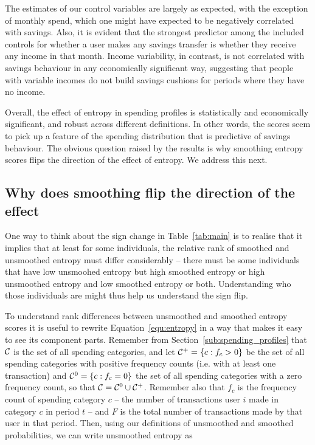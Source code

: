 The estimates of our control variables are largely as expected, with the
exception of monthly spend, which one might have expected to be negatively
correlated with savings. Also, it is evident that the strongest predictor among
the included controls for whether a user makes any savings transfer is whether
they receive any income in that month. Income variability, in contrast, is not
correlated with savings behaviour in any economically significant way,
suggesting that people with variable incomes do not build savings cushions for
periods where they have no income.

Overall, the effect of entropy in spending profiles is statistically and
economically significant, and robust across different definitions. In other
words, the scores seem to pick up a feature of the spending distribution that
is predictive of savings behaviour. The obvious question raised by the results
is why smoothing entropy scores flips the direction of the effect of entropy.
We address this next.


\subsection{Why does smoothing flip the direction of the effect}%
\label{sub:why_does_smoothing_flip_the_direction_of_the_effect}

One way to think about the sign change in Table~\ref{tab:main}
is to realise that it implies that at least for some individuals, the relative
rank of smoothed and unsmoothed entropy must differ considerably -- there must
be some individuals that have low unsmoohed entropy but high smoothed entropy
or high unsmoothed entropy and low smoothed entropy or both. Understanding who
those individuals are might thus help us understand the sign flip.

To understand rank differences between unsmoothed and smoothed entropy scores
it is useful to rewrite Equation~\ref{equ:entropy} in a way that makes it easy
to see its component parts. Remember from Section~\ref{sub:spending_profiles}
that $\mathcal{C}$ is the set of all spending categories, and let $\mathcal{C}^{+} = \{c: f_c
> 0\}$ be the set of all spending categories with positive frequency counts
(i.e.  with at least one transaction) and $\mathcal{C}^{0} = \{c: f_c = 0\}$ the set of
all spending categories with a zero frequency count, so that $\mathcal{C} = \mathcal{C}^{0}
\cup \mathcal{C}^{+}$. Remember also that $f_c$ is the frequency count of spending
category $c$ -- the number of transactions user $i$ made in category $c$ in
period $t$ -- and $F$ is the total number of transactions made by that user in
that period. Then, using our definitions of unsmoothed and smoothed
probabilities, we can write unsmoothed entropy as

